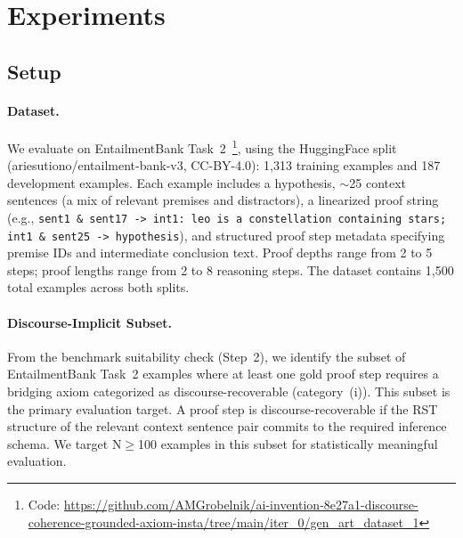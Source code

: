 \documentclass[11pt,letterpaper]{article}
\begin{document}
\section{Experiments}
\label{sec:experiments}

\subsection{Setup}

\paragraph{Dataset.}
We evaluate on EntailmentBank Task~2~\citep{Dalvi2021}\footnote{Code: \url{https://github.com/AMGrobelnik/ai-invention-8e27a1-discourse-coherence-grounded-axiom-insta/tree/main/iter_0/gen_art_dataset_1}},
using the HuggingFace split (ariesutiono/entailment-bank-v3, CC-BY-4.0): 1,313 training examples and 187 development
examples. Each example includes a hypothesis, $\sim$25 context sentences (a mix of relevant premises and
distractors), a linearized proof string (e.g., \texttt{sent1 \& sent17 -> int1: leo is a constellation containing
stars; int1 \& sent25 -> hypothesis}), and structured proof step metadata specifying premise IDs and intermediate
conclusion text. Proof depths range from 2 to 5 steps; proof lengths range from 2 to 8 reasoning steps. The dataset
contains 1,500 total examples across both splits.

\paragraph{Discourse-Implicit Subset.}
From the benchmark suitability check (Step~2), we identify the subset of EntailmentBank Task~2 examples where at
least one gold proof step requires a bridging axiom categorized as discourse-recoverable (category~(i)). This subset
is the primary evaluation target. A proof step is discourse-recoverable if the RST structure of the relevant context
sentence pair commits to the required inference schema. We target N$\geq$100 examples in this subset for
statistically meaningful evaluation.
\end{document}
